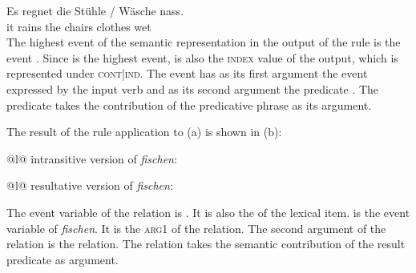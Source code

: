 \ea
\gll Es regnet die Stühle / Wäsche nass.\\
     it rains  the chairs {} clothes wet\\
\z
The highest event of the semantic representation in the output of the rule is the  event
. Since  is the highest event,  is also the \textsc{index} value of
the output, which is represented under \textsc{cont|ind}. The  event has as its first
argument the event expressed by the input verb  and as its second argument the
 predicate . The  predicate takes the contribution of the
predicative phrase  as its argument. 
\pagebreak

The result of the rule application to (a) is shown in (b):
\eal
\ex
\begin{tabular}[t]{@{}l@{}}
intransitive version of \emph{fischen}:\\
\end{tabular}

\ex 
\begin{tabular}[t]{@{}l@{}}
resultative version of \emph{fischen}:\\
\end{tabular}
\zl
The event variable of the  relation is . It is also the \indv of the lexical item.
 is the event variable of \emph{fischen}. It is the \textsc{arg1} of the 
relation. The second argument of the  relation is the  relation. The
 relation takes the semantic contribution of the result predicate  as argument.

